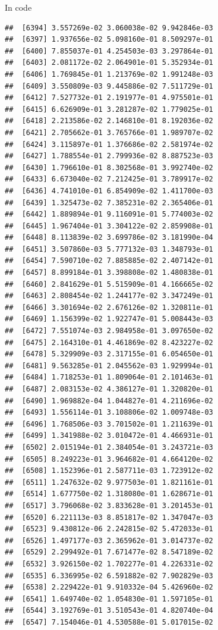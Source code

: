 \documentclass[ignorenonframetext,]{beamer}
\begin{document}
\begin{frame}[fragile]{In code}
\begin{verbatim}
##  [6394] 3.557269e-02 3.060038e-02 9.942846e-03
##  [6397] 1.937656e-02 5.098160e-01 8.509297e-01
##  [6400] 7.855037e-01 4.254503e-03 3.297864e-01
##  [6403] 2.081172e-02 2.064901e-01 5.352934e-01
##  [6406] 1.769845e-01 1.213769e-02 1.991248e-03
##  [6409] 3.550809e-03 9.445886e-02 7.511729e-01
##  [6412] 7.527732e-01 2.191977e-01 4.975501e-01
##  [6415] 6.626909e-01 3.281287e-02 1.779025e-01
##  [6418] 2.213586e-02 2.146810e-01 8.192036e-02
##  [6421] 2.705662e-01 3.765766e-01 1.989707e-02
##  [6424] 3.115897e-01 1.376686e-02 2.581974e-02
##  [6427] 1.788554e-01 2.799936e-02 8.887523e-03
##  [6430] 1.796610e-01 8.302568e-01 3.992740e-02
##  [6433] 6.673040e-02 7.212425e-01 3.789917e-02
##  [6436] 4.741010e-01 6.854909e-02 1.411700e-03
##  [6439] 1.325473e-02 7.385231e-02 2.365406e-01
##  [6442] 1.889894e-01 9.116091e-01 5.774003e-02
##  [6445] 1.967404e-01 3.304122e-02 2.859908e-01
##  [6448] 8.113839e-02 3.699786e-02 3.181990e-04
##  [6451] 3.507860e-03 5.777132e-03 1.348793e-01
##  [6454] 7.590710e-02 7.885885e-02 2.407142e-01
##  [6457] 8.899184e-01 3.398808e-02 1.480838e-01
##  [6460] 2.841629e-01 5.515909e-01 4.166665e-02
##  [6463] 2.808454e-02 1.244177e-02 3.347249e-01
##  [6466] 3.301694e-02 2.676126e-02 1.320811e-01
##  [6469] 1.156399e-02 1.922747e-01 5.008443e-03
##  [6472] 7.551074e-03 2.984958e-01 3.097650e-02
##  [6475] 2.164310e-01 4.461869e-02 8.423227e-02
##  [6478] 5.329909e-03 2.317155e-01 6.054650e-01
##  [6481] 9.563285e-01 2.045562e-03 1.929994e-01
##  [6484] 1.718253e-01 1.809064e-01 2.101463e-01
##  [6487] 2.083153e-02 4.386127e-01 1.320820e-01
##  [6490] 1.969882e-04 1.044827e-01 4.211696e-02
##  [6493] 1.556114e-01 3.108806e-02 1.009748e-03
##  [6496] 1.768506e-03 3.701502e-01 1.211639e-01
##  [6499] 1.341988e-02 3.010472e-01 4.466931e-01
##  [6502] 2.015194e-01 2.384054e-01 3.243721e-03
##  [6505] 8.249223e-01 3.964682e-01 4.664120e-02
##  [6508] 1.152396e-01 2.587711e-03 1.723912e-02
##  [6511] 1.247632e-02 9.977503e-01 1.821161e-01
##  [6514] 1.677750e-02 1.318080e-01 1.628671e-01
##  [6517] 3.796068e-02 3.833628e-01 3.201453e-01
##  [6520] 6.221113e-03 8.851817e-02 1.347047e-03
##  [6523] 9.430812e-06 2.242815e-02 5.472033e-01
##  [6526] 1.497177e-03 2.365962e-01 3.014737e-02
##  [6529] 2.299492e-01 7.671477e-02 8.547189e-02
##  [6532] 3.926150e-02 1.702277e-01 4.226331e-02
##  [6535] 6.336995e-02 6.591882e-02 7.902829e-03
##  [6538] 2.229422e-01 9.910332e-04 5.426960e-02
##  [6541] 1.649740e-02 1.054830e-01 1.597105e-01
##  [6544] 3.192769e-01 3.510543e-01 4.820740e-04
##  [6547] 7.154046e-01 4.530588e-01 5.017015e-02

\end{verbatim}
\end{frame}
\end{document}
